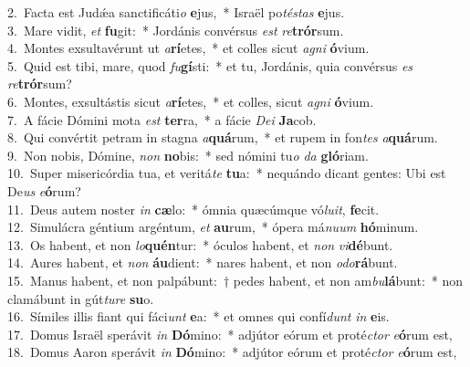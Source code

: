 {2.~}Facta est Judǽa sanctificáti\textit{o} \textbf{e}jus,~* Israël po\textit{té}\textit{stas} \textbf{e}jus.\\
{3.~}Mare vidit, \textit{et} \textbf{fu}git:~* Jordánis convérsus \textit{est} \textit{re}\textbf{trór}sum.\\
{4.~}Montes exsultavérunt ut \textit{a}\textbf{rí}etes,~* et colles sicut \textit{a}\textit{gni} \textbf{ó}vium.\\
{5.~}Quid est tibi, mare, quod \textit{fu}\textbf{gí}sti:~* et tu, Jordánis, quia convérsus \textit{es} \textit{re}\textbf{trór}sum?\\
{6.~}Montes, exsultástis sicut \textit{a}\textbf{rí}etes,~* et colles, sicut \textit{a}\textit{gni} \textbf{ó}vium.\\
{7.~}A fácie Dómini mota \textit{est} \textbf{ter}ra,~* a fácie \textit{De}\textit{i} \textbf{Ja}cob.\\
{8.~}Qui convértit petram in stagna \textit{a}\textbf{quá}rum,~* et rupem in fon\textit{tes} \textit{a}\textbf{quá}rum.\\
{9.~}Non nobis, Dómine, \textit{non} \textbf{no}bis:~* sed nómini tu\textit{o} \textit{da} \textbf{gló}riam.\\
{10.~}Super misericórdia tua, et veritá\textit{te} \textbf{tu}a:~* nequándo dicant gentes: Ubi est De\textit{us} \textit{e}\textbf{ó}rum?\\
{11.~}Deus autem noster \textit{in} \textbf{cæ}lo:~* ómnia quæcúmque vó\textit{lu}\textit{it}, \textbf{fe}cit.\\
{12.~}Simulácra géntium argéntum, \textit{et} \textbf{au}rum,~* ópera má\textit{nu}\textit{um} \textbf{hó}minum.\\
{13.~}Os habent, et non \textit{lo}\textbf{quén}tur:~* óculos habent, et \textit{non} \textit{vi}\textbf{dé}bunt.\\
{14.~}Aures habent, et \textit{non} \textbf{áu}dient:~* nares habent, et non \textit{o}\textit{do}\textbf{rá}bunt.\\
{15.~}Manus habent, et non palpábunt:~† pedes habent, et non am\textit{bu}\textbf{lá}bunt:~* non clamábunt in gút\textit{tu}\textit{re} \textbf{su}o.\\
{16.~}Símiles illis fiant qui fáci\textit{unt} \textbf{e}a:~* et omnes qui confí\textit{dunt} \textit{in} \textbf{e}is.\\
{17.~}Domus Israël sperávit \textit{in} \textbf{Dó}mino:~* adjútor eórum et proté\textit{ctor} \textit{e}\textbf{ó}rum est,\\
{18.~}Domus Aaron sperávit \textit{in} \textbf{Dó}mino:~* adjútor eórum et proté\textit{ctor} \textit{e}\textbf{ó}rum est,\\
